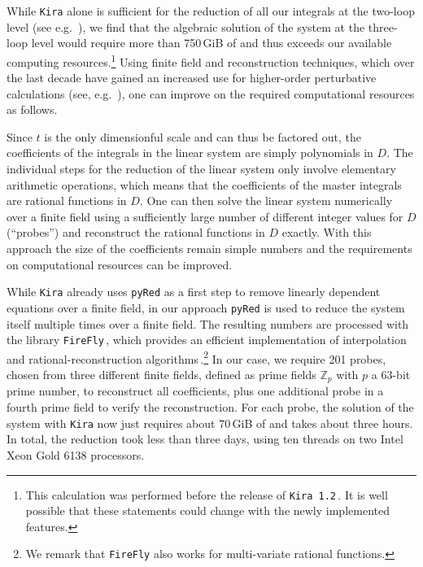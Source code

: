 While \texttt{Kira} alone is sufficient
for the reduction of all our integrals at the two-loop level (see
e.g.\ ), we find that the algebraic solution
of the system at the three-loop level would require more than
750\,GiB of  and thus exceeds our available computing
resources.\footnote{This calculation was performed before the release of
  \texttt{Kira 1.2}\,\cite{Maierhofer:2018gpa}. It is well possible that
  these statements could change with the newly implemented features.}
Using finite field and
reconstruction techniques, which
over the last decade have gained an increased use for higher-order
perturbative calculations (see,
e.g.\ ), one can improve on the required computational resources as
follows.

Since $t$
is the only dimensionful scale and can thus be factored out, the
coefficients of the integrals in the linear system are simply
polynomials in $D$. The individual steps for the reduction of the linear system only involve
elementary arithmetic operations, which means that the coefficients of the master
integrals are rational functions in $D$. One can then solve the linear system
numerically over a finite field using a sufficiently large number of different integer
values for $D$ (``probes'') and reconstruct the rational functions in $D$ exactly. With this approach
the size of the coefficients remain simple numbers and the requirements on computational
resources can be improved.

While \texttt{Kira} already uses \texttt{pyRed} as a first step to remove
linearly dependent equations over a finite field, in our approach \texttt{pyRed} is used
to reduce the system itself multiple times over a finite field.
The resulting numbers are processed with the
library \texttt{FireFly}\,\cite{Klappert:2019emp}, which provides an
efficient implementation of interpolation\,\cite{Zippel:1990,Cuyt:2011}
and rational-reconstruction
algorithms\,\cite{Wang:1981,Monagan:2004}.\footnote{We remark that
  \texttt{FireFly} also works for multi-variate rational functions.}  In
our case, we require 201 probes, chosen from three different finite
fields, defined as prime fields $\mathbb{Z}_p$ with $p$ a 63-bit prime
number, to reconstruct all coefficients, plus one additional probe in a
fourth prime field to verify the reconstruction. For each probe, the
solution of the system with \texttt{Kira} now just requires about 70\,GiB of
 and takes about three  hours.  In total, the reduction took
less than three days, using ten threads on two Intel Xeon Gold 6138
processors.

